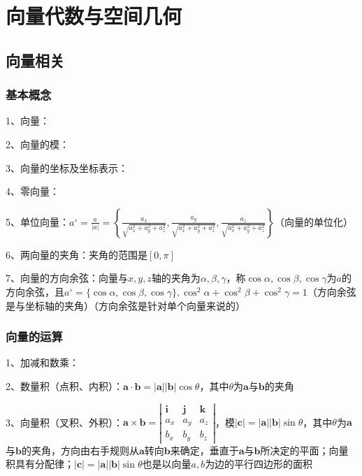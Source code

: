 \chapter{向量代数与空间几何}

\section{向量相关}



\subsection{基本概念}

1、向量：

2、向量的模：

3、向量的坐标及坐标表示：

4、零向量：

5、单位向量：$a^{\circ}=\frac{a}{|a|}=\left\{\frac{a_{x}}{\sqrt{a_{x}^{2}+a_{y}^{2}+a_{z}^{2}}}, \frac{a_{y}}{\sqrt{a_{x}^{2}+a_{y}^{2}+a_{z}^{2}}}, \frac{a_{z}}{\sqrt{a_{x}^{2}+a_{y}^{2}+a_{z}^{2}}}\right\}$（向量的单位化）

6、两向量的夹角：夹角的范围是$[0,\pi]$

7、向量的方向余弦：向量与$x,y,z$轴的夹角为$\alpha, \beta, \gamma$，称$\cos \alpha, \cos \beta, \cos \gamma$为$a$的方向余弦，且$a^{\circ}=\{\cos \alpha, \cos \beta, \cos \gamma\}, \cos ^{2} \alpha+\cos ^{2} \beta+\cos ^{2} \gamma=1$（方向余弦是与坐标轴的夹角）（方向余弦是针对单个向量来说的）



\subsection{向量的运算}

1、加减和数乘：

2、数量积（点积、内积）：$\boldsymbol{a} \cdot \boldsymbol{b}=|\boldsymbol{a}||\boldsymbol{b}| \cos \theta$，其中$\theta$为$\boldsymbol{a}$与$\boldsymbol{b}$的夹角

3、向量积（叉积、外积）：$\boldsymbol{a} \times \boldsymbol{b}=\left|\begin{array}{ccc}\boldsymbol{i} & \boldsymbol{j} & \boldsymbol{k} \\a_{x} & a_{y} & a_{z} \\b_{x} & b_{y} & b_{z}\end{array}\right|$，模$|\boldsymbol{c}|=|\boldsymbol{a}||\boldsymbol{b}| \sin \theta$，其中$\theta$为$\boldsymbol{a}$与$\boldsymbol{b}$的夹角，方向由右手规则从$\boldsymbol{a}$转向$\boldsymbol{b}$来确定，垂直于$\boldsymbol{a}$与$\boldsymbol{b}$所决定的平面；向量积具有分配律；$|\boldsymbol{c}|=|\boldsymbol{a}||\boldsymbol{b}| \sin \theta$也是以向量$a,b$为边的平行四边形的面积

